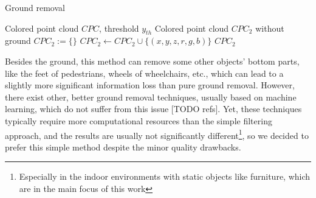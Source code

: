 \begin{algorithm}
    \caption{Ground removal}\label{alg:groundRemoval}
    \begin{algorithmic}
        \Require Colored point cloud $CPC$, threshold $y_{th}$
        \Ensure Colored point cloud $CPC_2$ without ground
        \State $CPC_2 := \{\}$  
         
         
        \State $CPC_2 \leftarrow CPC_2 \cup \{(x,y,z,r,g,b)\}$  
        \EndIf
        \EndFor
        \State\Return $CPC_2$
    \end{algorithmic}
\end{algorithm}

Besides the ground, this method can remove some other objects' bottom parts, like the feet of pedestrians, wheels of wheelchairs, etc., which can lead to a slightly more significant information loss than pure ground removal. However, there exist other, better ground removal techniques, usually based on machine learning, which do not suffer from this issue [TODO refs]. Yet, these techniques typically require more computational resources than the simple filtering approach, and the results are usually not significantly different\footnote{Especially in the indoor environments with static objects like furniture, which are in the main focus of this work}, so we decided to prefer this simple method despite the minor quality drawbacks.